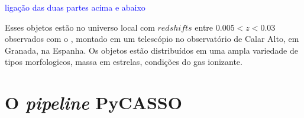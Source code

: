 \ojo \textcolor{blue}{ligação das duas partes acima e abaixo}
 
Esses objetos estão no universo local com $redshifts$ entre $0.005 < z < 0.03$
observados com o , montado em um telescópio no
observatório de Calar Alto, em Granada, na Espanha. Os objetos estão
distribuídos em uma ampla variedade de tipos morfologicos, massa em estrelas,
condições do gas ionizante.


\section{O {\em pipeline} PyCASSO}
\label{sec:CALePyC:PyCASSO}

